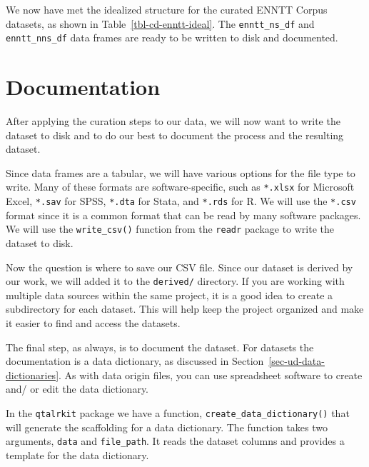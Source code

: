 \documentclass[
  letterpaper,
  DIV=11,
  numbers=noendperiod]{scrreprt}
\theoremstyle{definition}
\theoremstyle{remark}
\begin{document}
We now have met the idealized structure for the curated ENNTT Corpus
datasets, as shown in Table~\ref{tbl-cd-enntt-ideal}. The
\texttt{enntt\_ns\_df} and \texttt{enntt\_nns\_df} data frames are ready
to be written to disk and documented.

\section{Documentation}\label{documentation}

After applying the curation steps to our data, we will now want to write
the dataset to disk and to do our best to document the process and the
resulting dataset.

Since data frames are a tabular, we will have various options for the
file type to write. Many of these formats are software-specific, such as
\texttt{*.xlsx} for Microsoft Excel, \texttt{*.sav} for SPSS,
\texttt{*.dta} for Stata, and \texttt{*.rds} for R. We will use the
\texttt{*.csv} format since it is a common format that can be read by
many software packages. We will use the \texttt{write\_csv()} function
from the \texttt{readr} package to write the dataset to disk.

Now the question is where to save our CSV file. Since our dataset is
derived by our work, we will added it to the \texttt{derived/}
directory. If you are working with multiple data sources within the same
project, it is a good idea to create a subdirectory for each dataset.
This will help keep the project organized and make it easier to find and
access the datasets.

The final step, as always, is to document the dataset. For datasets the
documentation is a data dictionary, as discussed in
Section~\ref{sec-ud-data-dictionaries}. As with data origin files, you
can use spreadsheet software to create and/ or edit the data dictionary.

In the \texttt{qtalrkit} package we have a function,
\texttt{create\_data\_dictionary()} that will generate the scaffolding
for a data dictionary. The function takes two arguments, \texttt{data}
and \texttt{file\_path}. It reads the dataset columns and provides a
template for the data dictionary.
\end{document}
